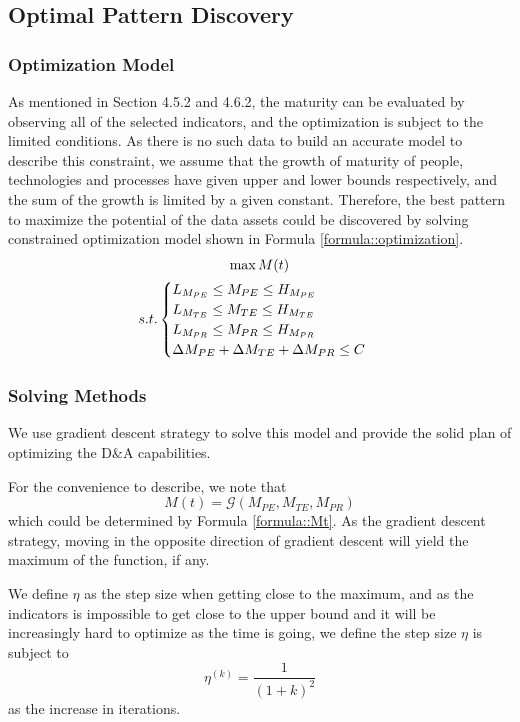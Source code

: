 \documentclass{mcmthesis}
\begin{document}
\subsection{Optimal Pattern Discovery}
\subsubsection{Optimization Model}
As mentioned in Section 4.5.2 and 4.6.2, the maturity can be evaluated by observing all of the selected indicators, and the optimization is subject to the limited conditions. As there is no such data to build an accurate model to describe this constraint, we assume that the growth of maturity of people, technologies and processes have given upper and lower bounds respectively, and the sum of the growth is limited by a given constant. Therefore, the best pattern to maximize the potential of the data assets could be discovered by solving constrained optimization model shown in Formula \ref{formula::optimization}.
\begin{gather}
    \max M(t) \notag\\
    s.t.\begin{cases}
    L_{M_{PE}} \leq M_{PE} \leq H_{M_{PE}} \\
    L_{M_{TE}} \leq M_{TE} \leq H_{M_{TE}} \\
    L_{M_{PR}} \leq M_{PR} \leq H_{M_{PR}} \\
    \Delta M_{PE} + \Delta M_{TE} + \Delta M_{PR} \leq C
    \end{cases} 
    \label{formula::optimization}
\end{gather}

\subsubsection{Solving Methods}
We use gradient descent strategy to solve this model and provide the solid plan of optimizing the D\&A capabilities.

For the convenience to describe, we note that
\begin{equation}
    M(t) = \mathscr{G}(M_{PE},M_{TE},M_{PR})
\end{equation}
which could be determined by Formula \ref{formula::Mt}. As the gradient descent strategy, moving in the opposite direction of gradient descent will yield the maximum of the function, if any. 

We define $\eta$ as the step size when getting close to the maximum, and as the indicators is impossible to get close to the upper bound and it will be increasingly hard to optimize as the time is going, we define the step size $\eta$ is subject to
\begin{equation}
    \eta^{(k)} = \frac{1}{(1+k)^2}
\end{equation}
as the increase in iterations.
\end{document}
